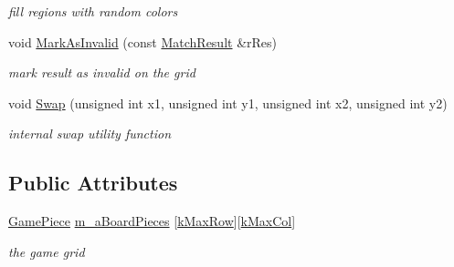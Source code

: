 \begin{DoxyCompactItemize}
\begin{DoxyCompactList}\small\item\em fill regions with random colors \end{DoxyCompactList}\item 
\hypertarget{class_game_board_ab0efd3dff450be2ab0ba740808236acc}{void \hyperlink{class_game_board_ab0efd3dff450be2ab0ba740808236acc}{Mark\-As\-Invalid} (const \hyperlink{struct_game_board_1_1_match_result}{Match\-Result} \&r\-Res)}\label{class_game_board_ab0efd3dff450be2ab0ba740808236acc}

\begin{DoxyCompactList}\small\item\em mark result as invalid on the grid \end{DoxyCompactList}\item 
\hypertarget{class_game_board_a634cfcaf3d787ff29822bc6fec88816e}{void \hyperlink{class_game_board_a634cfcaf3d787ff29822bc6fec88816e}{Swap} (unsigned int x1, unsigned int y1, unsigned int x2, unsigned int y2)}\label{class_game_board_a634cfcaf3d787ff29822bc6fec88816e}

\begin{DoxyCompactList}\small\item\em internal swap utility function \end{DoxyCompactList}\end{DoxyCompactItemize}
\subsection*{Public Attributes}
\begin{DoxyCompactItemize}
\item 
\hypertarget{class_game_board_a94e82179e6a2b7a176f69e245b1d40fb}{\hyperlink{class_game_piece}{Game\-Piece} \hyperlink{class_game_board_a94e82179e6a2b7a176f69e245b1d40fb}{m\-\_\-a\-Board\-Pieces} \mbox{[}\hyperlink{class_game_board_ab579dd1e4a379675c58778d1da128e74}{k\-Max\-Row}\mbox{]}\mbox{[}\hyperlink{class_game_board_a898b0f017577f1384d9c58a04b392bf3}{k\-Max\-Col}\mbox{]}}\label{class_game_board_a94e82179e6a2b7a176f69e245b1d40fb}

\begin{DoxyCompactList}\small\item\em the game grid \end{DoxyCompactList}\end{DoxyCompactItemize}
